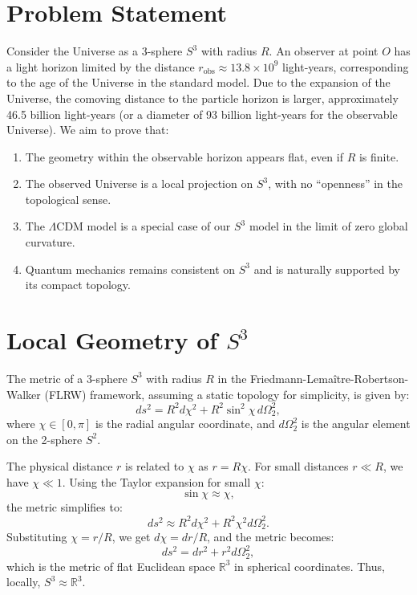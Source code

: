 \documentclass[12pt]{article}
\begin{document}
\section{Problem Statement}

Consider the Universe as a 3-sphere \(S^3\) with radius \(R\). An observer at point \(O\) has a light horizon limited by the distance \(r_{\mathrm{obs}} \approx 13.8 \times 10^9\) light-years, corresponding to the age of the Universe in the standard model. Due to the expansion of the Universe, the comoving distance to the particle horizon is larger, approximately 46.5 billion light-years (or a diameter of 93 billion light-years for the observable Universe). We aim to prove that:

\begin{enumerate}
\item The geometry within the observable horizon appears flat, even if \(R\) is finite.
\item The observed Universe is a local projection on \(S^3\), with no ``openness'' in the topological sense.
\item The \(\Lambda\)CDM model is a special case of our \(S^3\) model in the limit of zero global curvature.
\item Quantum mechanics remains consistent on \(S^3\) and is naturally supported by its compact topology.
\end{enumerate}

\section{Local Geometry of \(S^3\)}

The metric of a 3-sphere \(S^3\) with radius \(R\) in the Friedmann-Lemaître-Robertson-Walker (FLRW) framework, assuming a static topology for simplicity, is given by:
\begin{equation}
 ds^2 = R^2 d\chi^2 + R^2 \sin^2\chi\, d\Omega_2^2,
\end{equation}
where \(\chi \in [0,\pi]\) is the radial angular coordinate, and \(d\Omega_2^2\) is the angular element on the 2-sphere \(S^2\).

The physical distance \(r\) is related to \(\chi\) as \(r = R\chi\). For small distances \(r \ll R\), we have \(\chi \ll 1\). Using the Taylor expansion for small \(\chi\):
\begin{equation}
 \sin\chi \approx \chi,
\end{equation}
the metric simplifies to:
\begin{equation}
 ds^2 \approx R^2 d\chi^2 + R^2 \chi^2 d\Omega_2^2.
\end{equation}
Substituting \(\chi = r/R\), we get \(d\chi = dr/R\), and the metric becomes:
\begin{equation}
 ds^2 = dr^2 + r^2 d\Omega_2^2,
\end{equation}
which is the metric of flat Euclidean space \(\mathbb{R}^3\) in spherical coordinates. Thus, locally, \(S^3 \approx \mathbb{R}^3\).
\end{document}
